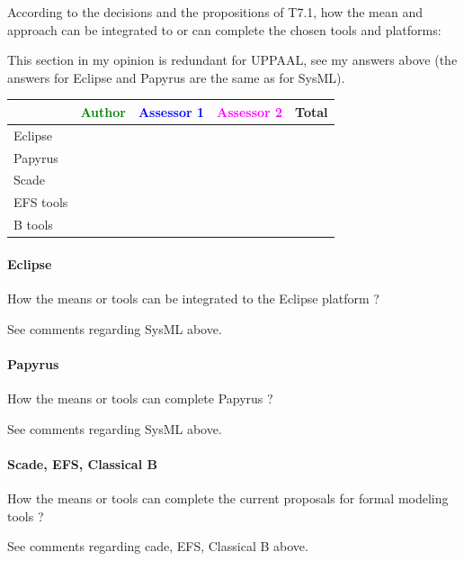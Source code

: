 According to the decisions and the propositions of T7.1, how the mean and approach can be integrated to or can complete the chosen tools and platforms:

\begin{author_comment}
This section in my opinion is redundant for UPPAAL, see my answers above (the answers for Eclipse and Papyrus are the same as for SysML).
\end{author_comment}

\begin{tabular}{|l | c | c | c | c|}
\hline
& \textcolor{green}{Author} & \textcolor{blue}{Assessor 1} & \textcolor{magenta}{Assessor 2} & Total \\
\hline 
Eclipse & & & &  \\
\hline
Papyrus  & & & & \\
\hline
Scade & & & & \\
\hline
EFS tools & & & & \\
\hline
B tools & & & & \\
\hline
\end{tabular}


\paragraph{Eclipse}
How the means or tools can be integrated to the Eclipse platform ?

\begin{author_comment}
See comments regarding SysML above.
\end{author_comment}

\paragraph{Papyrus}
How the means or tools can complete  Papyrus ?

\begin{author_comment}
See comments regarding SysML above.
\end{author_comment}


\paragraph{Scade, EFS, Classical B}
How the means or tools can complete the current proposals for formal modeling tools ?

\begin{author_comment}
See comments regarding cade, EFS, Classical B above.
\end{author_comment}


